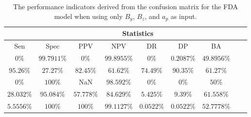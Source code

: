\begin{table}[!ht]
	\centering
	\begin{tabular}{|c|c|c|c|c|c|c|c|c|}
		\hline
		 & \multicolumn{7}{c|}{Statistics} \\ \hline
		Sen & Spec & PPV & NPV & DR & DP & BA \\ \hline
		$0\%$ & $99.7911\%$ & $0\%$ & $99.8955\%$ & $0\%$ & $0.2087\%$ & $49.8956\%$ \\ \hline
		$95.26\%$ & $27.27\%$ & $82.45\%$ & $61.62\%$ & $74.49\%$ & $90.35\%$ & $61.27\%$ \\ \hline
		$0\%$ & $100\%$ & NaN & $98.592\%$ & $0\%$ & $0\%$ & $50\%$ \\ \hline
		$28.032\%$ & $95.084\%$ & $57.778\%$ & $84.629\%$ & $5.425\%$ & $9.39\%$ & $61.558\%$ \\ \hline
		$5.5556\%$ & $100\%$ & $100\%$ & $99.1127\%$ & $0.0522\%$ & $0.0522\%$ & $52.7778\%$ \\ \hline
	\end{tabular}
	\caption{The performance indicators derived from the confusion matrix for the FDA model when using only $B_{y}$, $B_{z}$, and $a_{p}$ as input.}
	\label{tab:cs:yzap:fda}
\end{table}
